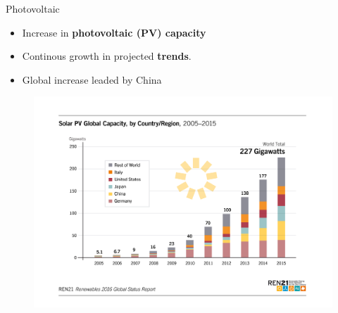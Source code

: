 \documentclass{beamer}%
\begin{document}
\begin{frame}[fragile]{Photovoltaic}
\begin{itemize}
\item Increase in \textbf{\alert{photovoltaic (PV) capacity}}
\item Continous growth in projected \textbf{\alert{trends}}.
\item Global increase leaded by China  
\end{itemize}
\begin{figure}
\centering\includegraphics[scale=0.3]{GSR_2016_Figure_15}
\end{figure}
\end{frame}
\end{document}

